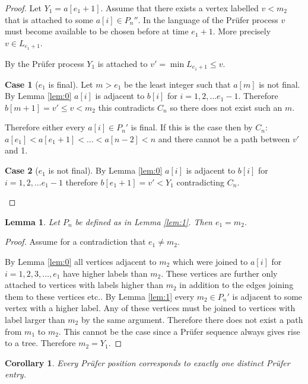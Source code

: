 \documentclass[10pt]{article} %
\newtheorem{lem}[thm]{Lemma}
\newtheorem{cor}[thm]{Corollary}
\theoremstyle{definition}
\newtheorem{case}{Case}
\begin{document}
\begin{proof}
Let $Y_{1} = a[e_{1} + 1]$.  Assume that there exists a vertex labelled $v <m_{2}$ that is attached to some $a[i] \in P_{n}''$. In the language of the Pr\"{u}fer process $v$ must become available to be chosen before at time $e_{1} + 1$.  More precisely $v \in L_{e_{1} + 1}$.  

By the Pr\"{u}fer process $Y_{1}$ is attached to $ v' = \min L_{e_{1} + 1} \leq v$.

\begin{case}[$e_{1}$ is final]
Let $m > e_{1}$ be the least integer such that $a[m]$ is not final. By Lemma \ref{lem:0} $a[i]$ is adjacent to $b[i]$ for $i = 1,2,\dots e_{1}-1$.  Therefore $b[m+1]  = v' \leq v < m_{2}$ this contradicts $C_{n}$ so there does not exist such an $m$.  

Therefore either every $a[i] \in P_{n}'$ is final.  If this is the case then by $C_{n}$: $a[e_{1}] < a[e_{1} + 1] < \dots <a[n-2] < n$ and there cannot be a path between $v'$  and 1.
\end{case}
\begin{case}[$e_{1}$ is not final]
By Lemma \ref{lem:0} $a[i]$ is adjacent to $b[i]$ for $i = 1,2,\dots e_{1}-1$ therefore $b[e_{1}+1] = v' < Y_{1}$ contradicting $C_{n}$.  
 \end{case}
\end{proof}
\begin{lem}\label{lem:2}
 Let $P_{n}$ be defined as in Lemma \ref{lem:1}.  Then $e_{1} = m_{2}$.
\end{lem}
\begin{proof}
 Assume for a contradiction that $e_{1} \neq m_{2}$.  

By Lemma \ref{lem:0} all vertices adjacent to $m_{2}$ which were joined to $a[i]$ for $i = 1,2,3,\dots,e_{1}$ have higher labels than $m_{2}$.  These vertices are further only attached to vertices with labels higher than $m_{2}$ in addition to the edges joining them to these vertices etc..   By Lemma \ref{lem:1} every $m_{2} \in P_{n}'$ is adjacent to some vertex with a higher label. Any of these vertices must be joined to vertices with label larger than $m_{2}$ by the same argument.  Therefore there does not exist a path from $m_{1}$ to $m_{2}$.  This cannot be the case since a Pr\"{u}fer sequence always gives rise to a tree. Therefore $m_{2} = Y_{1}$.      
\end{proof}


\begin{cor}\label{cor:1}
 Every Pr\"{u}fer position corresponds to exactly one distinct Pr\"{u}fer entry.  
\end{cor}
\end{document}
